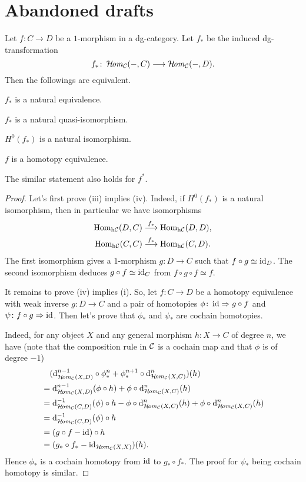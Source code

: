 \printbibliography
\clearpage
\appendix
\section*{Abandoned drafts}
\begin{proposition}
Let $f\colon C\to D$ be a $1$-morphism in a dg-category. 
Let $f_{\ast}$ be the induced dg-transformation
\[
f_{\ast}\colon\operatorname{\mathcal{H}\!\mathit{om}}_{{\cal C}}(-,C)\longrightarrow\operatorname{\mathcal{H}\!\mathit{om}}_{{\cal C}}(-,D).
\]
Then the followings are equivalent.
\begin{proplist}
\item 
$f_{\ast}$ is a natural equivalence.
\item 
$f_{\ast}$ is a natural quasi-isomorphism.
\item 
$H^0(f_{\ast})$ is a natural isomorphism.
\item 
$f$ is a homotopy equivalence.
\end{proplist}
The similar statement also holds for $f^{\ast}$.
\end{proposition}
\begin{proof}
Let's first prove (iii) implies (iv). 
Indeed, if $H^0(f_{\ast})$ is a natural isomorphism, then 
in particular we have isomorphisms
\begin{align*}
\operatorname{Hom}_{\mathrm{h}{\cal C}}(D,C) &\stackrel{{f_{\ast}}}{\longrightarrow} \operatorname{Hom}_{\mathrm{h}{\cal C}}(D,D),\\
\operatorname{Hom}_{\mathrm{h}{\cal C}}(C,C) &\stackrel{{f_{\ast}}}{\longrightarrow} \operatorname{Hom}_{\mathrm{h}{\cal C}}(C,D).
\end{align*}
The first isomorphism gives a $1$-morphism $g\colon D\to C$ 
such that $f\circ g\simeq\operatorname{id}_D$. 
The second isomorphism deduces $g\circ f\simeq\operatorname{id}_C$ 
from $f\circ g\circ f\simeq f$.

It remains to prove (iv) implies (i). 
So, let $f\colon C\to D$ be a homotopy equivalence with 
weak inverse $g\colon D\to C$ and a pair of homotopies 
$\phi\colon\operatorname{id}\Rightarrow g\circ f$ and 
$\psi\colon f\circ g\Rightarrow\operatorname{id}$.
Then let's prove that $\phi_{\ast}$ and $\psi_{\ast}$ 
are cochain homotopies. 

Indeed, for any object $X$ and any general morphism 
$h\colon X\to C$ of degree $n$, we have
(note that the composition rule in ${\cal C}$ is a cochain map 
and that $\phi$ is of degree $-1$)
\begin{align*}
&\quad
(\di_{\HHom_{\Cc}(X,D)}^{n-1}\circ\phi_{\ast}^n+
\phi_{\ast}^{n+1}\circ\di_{\HHom_{\Cc}(X,C)}^n)
(h)\\
&= 
\di_{\HHom_{\Cc}(X,D)}^{n-1}(\phi\circ h) + 
\phi\circ\di_{\HHom_{\Cc}(X,C)}^n(h) \\
&= 
\di_{\HHom_{\Cc}(C,D)}^{-1}(\phi)\circ h - 
\phi\circ\di_{\HHom_{\Cc}(X,C)}^n(h) + 
\phi\circ\di_{\HHom_{\Cc}(X,C)}^n(h) \\
&=
\di_{\HHom_{\Cc}(C,D)}^{-1}(\phi)\circ h\\
&=
(g\circ f-\id)\circ h\\
&=
(g_{\ast}\circ f_{\ast} - \id_{\HHom_{\Cc}(X,X)})(h).
\end{align*}
Hence $\phi_{\ast}$ is a cochain homotopy 
from $\operatorname{id}$ to $g_{\ast}\circ f_{\ast}$. 
The proof for $\psi_{\ast}$ being cochain homotopy 
is similar. 
\end{proof}

